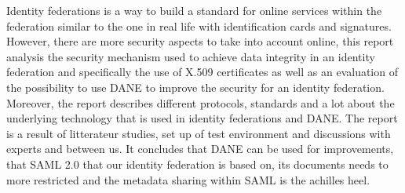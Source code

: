 Identity federations is a way to build a standard for online services within the 
federation similar to the one in real life with identification cards and signatures.
However, there are more security aspects to take into account online, this report 
analysis the security mechanism used to achieve data integrity in an identity 
federation and specifically the use of X.509 certificates as well as an evaluation of the 
possibility to use DANE to improve the security for an identity federation.
Moreover, the report describes different protocols, standards and a lot about the 
underlying technology that is used in identity federations and DANE. 
The report is a result of litterateur studies, set up of test environment and discussions 
with experts and between us. It concludes that DANE can be used for improvements, 
that SAML 2.0 that our identity federation is based on, its documents needs to more 
restricted and the metadata sharing within SAML is the achilles heel.






